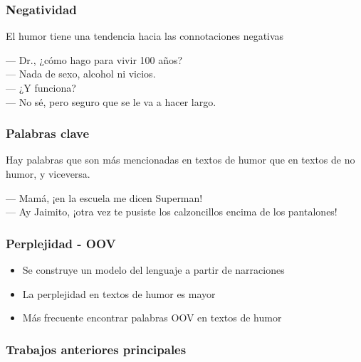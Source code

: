 \begin{frame}
    \frametitle{Negatividad}
    
    El humor tiene una tendencia hacia las connotaciones negativas

    \begin{example}
        --- Dr., ¿cómo hago para vivir 100 años? \\
        --- Nada de sexo, alcohol ni vicios. \\
        --- ¿Y funciona? \\
        --- No sé, pero seguro que se le va a hacer largo.
    \end{example}
\end{frame}

\begin{frame}
    \frametitle{Palabras clave}
    
    Hay palabras que son más mencionadas en textos de humor que en textos de no humor, y viceversa.
    
    \begin{example}
        --- Mamá, ¡en la escuela me dicen Superman! \\
        --- Ay Jaimito, ¡otra vez te pusiste los calzoncillos encima de los pantalones!
    \end{example}
\end{frame}

\begin{frame}
    \frametitle{Perplejidad - OOV}
    
    \begin{itemize}
        \item Se construye un modelo del lenguaje a partir de narraciones
        \item La perplejidad en textos de humor es mayor
        \item Más frecuente encontrar palabras OOV en textos de humor
    \end{itemize}
\end{frame}

\subsubsection{Trabajos anteriores principales}


